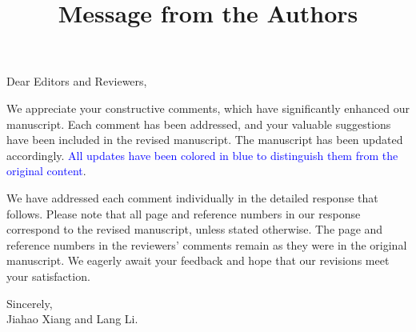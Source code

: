 \title{Message from the Authors}
\vskip 0.2in

\noindent Dear Editors and Reviewers,

\vskip 0.1in

\noindent We appreciate your constructive comments, which have significantly enhanced our manuscript. Each comment has been addressed, and your valuable suggestions have been included in the revised manuscript. The manuscript has been updated accordingly. \textcolor{blue}{All updates have been colored in blue to distinguish them from the original content}.

\noindent We have addressed each comment individually in the detailed response that follows. Please note that all page and reference numbers in our response correspond to the revised manuscript, unless stated otherwise. The page and reference numbers in the reviewers' comments remain as they were in the original manuscript. We eagerly await your feedback and hope that our revisions meet your satisfaction.
\vskip 0.2in

\noindent Sincerely, \\
\noindent Jiahao Xiang and Lang Li.

